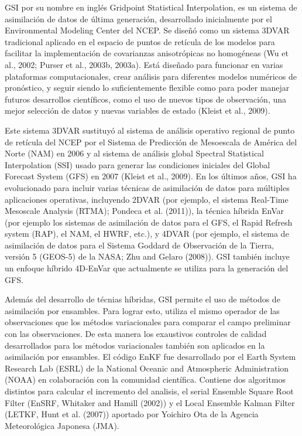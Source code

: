 \documentclass[12pt,oneside,a4paper]{reedthesis}
\begin{document}
GSI por su nombre en inglés Gridpoint Statistical Interpolation, es un sistema de asimilación de datos de última generación, desarrollado inicialmente por el Environmental Modeling Center del NCEP. Se diseñó como un sistema 3DVAR tradicional aplicado en el espacio de puntos de retícula de los modelos para facilitar la implementación de covarianzas anisotrópicas no homogéneas (Wu et al., 2002; Purser et al., 2003b, 2003a).
Está diseñado para funcionar en varias plataformas computacionales, crear análisis para diferentes modelos numéricos de pronóstico, y seguir siendo lo suficientemente flexible como para poder manejar futuros desarrollos científicos, como el uso de nuevos tipos de observación, una mejor selección de datos y nuevas variables de estado (Kleist et al., 2009).

Este sistema 3DVAR sustituyó al sistema de análisis operativo regional de punto de retícula del NCEP por el Sistema de Predicción de Mesoescala de América del Norte (NAM) en 2006 y al sistema de análisis global Spectral Statistical Interpolation (SSI) usado para generar las condiciones iniciales del Global Forecast System (GFS) en 2007 (Kleist et al., 2009).
En los últimos años, GSI ha evolucionado para incluir varias técnicas de asimilación de datos para múltiples aplicaciones operativas, incluyendo 2DVAR (por ejemplo, el sistema Real-Time Mesoscale Analysis (RTMA); Pondeca et al. (2011)), la técnica híbrida EnVar (por ejemplo los sistemas de asimilación de datos para el GFS, el Rapid Refresh system (RAP), el NAM, el HWRF, etc.), y 4DVAR (por ejemplo, el sistema de asimilación de datos para el Sistema Goddard de Observación de la Tierra, versión 5 (GEOS-5) de la NASA; Zhu and Gelaro (2008)).
GSI también incluye un enfoque híbrido 4D-EnVar que actualmente se utiliza para la generación del GFS.

Además del desarrollo de técnias híbridas, GSI permite el uso de métodos de asimilación por ensambles. Para lograr esto, utiliza el mismo operador de las observaciones que los métodos variacionales para comparar el campo preliminar con las observaciones.
De esta manera los exaustivos controles de calidad desarrollados para los métodos variacionales también son aplicados en la asimilación por ensambles.
El código EnKF fue desarrollado por el Earth System Research Lab (ESRL) de la National Oceanic and Atmospheric Administration (NOAA) en colaboración con la comunidad científica.
Contiene dos algoritmos distintos para calcular el incremento del analisis, el serial Ensemble Square Root Filter (EnSRF, Whitaker and Hamill (2002)) y el Local Ensemble Kalman Filter (LETKF, Hunt et al. (2007)) aportado por Yoichiro Ota de la Agencia Meteorológica Japonesa (JMA).
\end{document}

